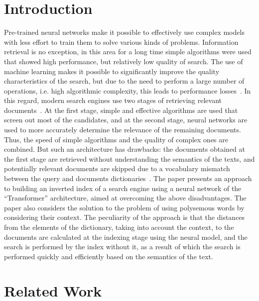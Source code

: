 \documentclass[
    twocolumn,
]{template/ceurart}
\begin{document}
    \section{Introduction}
    Pre-trained neural networks make it possible to effectively use complex models with less effort
    to train them to solve various kinds of problems.
    Information retrieval is no exception, in this area for a long time simple algorithms
    were used that showed high performance, but relatively low quality of search.
    The use of machine learning makes it possible to significantly improve the quality
    characteristics of the search, but due to the need to perform a large number of operations,
    i.e. high algorithmic complexity, this leads to performance losses~\cite{performanceLoss}.
    In this regard, modern search engines use two stages of retrieving relevant documents~\cite{multiStageRetrieval}.
    At the first stage, simple and effective algorithms are used that screen out most of the candidates,
    and at the second stage, neural networks are used to more accurately determine
    the relevance of the remaining documents.
    Thus, the speed of simple algorithms and the quality of complex ones are combined.
    But such an architecture has drawbacks: the documents obtained at the first stage are retrieved
    without understanding the semantics of the texts, and potentially relevant documents are skipped
    due to a vocabulary mismatch between the query and documents dictionaries~\cite{vocabularyMismatch1,vocabularyMismatch2}.
    The paper presents an approach to building an inverted index of a search engine using a neural network
    of the ``Transformer'' architecture, aimed at overcoming the above disadvantages.
    The paper also considers the solution to the problem of using polysemous words by considering their context.
    The peculiarity of the approach is that the distances from the elements of the dictionary,
    taking into account the context, to the documents are calculated at the indexing stage using the neural model,
    and the search is performed by the index without it, as a result of which the search is performed quickly
    and efficiently based on the semantics of the text.


    \section{Related Work}
\end{document}
